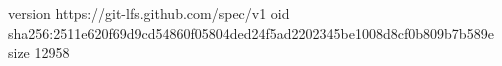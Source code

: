 version https://git-lfs.github.com/spec/v1
oid sha256:2511e620f69d9cd54860f05804ded24f5ad2202345be1008d8cf0b809b7b589e
size 12958
